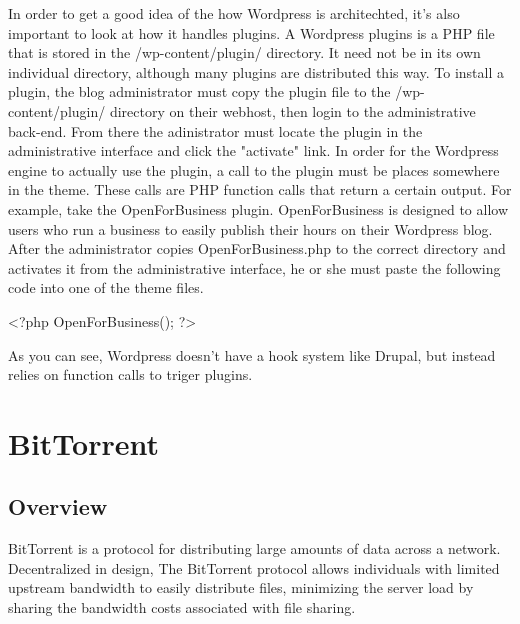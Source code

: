 \documentclass[a4paper,12pt]{report}
\begin{document}
In order to get a good idea of the how Wordpress is architechted, it's also important to look at how it handles plugins. 
A Wordpress plugins is a PHP file that is stored in the /wp-content/plugin/ directory. 
It need not be in its own individual directory, although many plugins are distributed this way. 
To install a plugin, the blog administrator must copy the plugin file to the /wp-content/plugin/ directory on their webhost, then login to the administrative back-end. 
From there the adinistrator must locate the plugin in the administrative interface and click the "activate" link. 
In order for the Wordpress engine to actually use the plugin, a call to the plugin must be places somewhere in the theme. 
These calls are PHP function calls that return a certain output. 
For example, take the OpenForBusiness plugin. 
OpenForBusiness is designed to allow users who run a business to easily publish their hours on their Wordpress blog. 
After the administrator copies OpenForBusiness.php to the correct directory and activates it from the administrative interface, he or she must paste the following code into one of the theme files. 

<?php OpenForBusiness(); ?>

As you can see, Wordpress doesn't have a hook system like Drupal, but instead relies on function calls to triger plugins. 


\chapter{BitTorrent}

\section{Overview}
BitTorrent is a protocol for distributing large amounts of data across a network.
Decentralized in design, The BitTorrent protocol allows individuals with limited upstream bandwidth to easily distribute files, minimizing the server load by sharing the bandwidth costs associated with file sharing.
\end{document}
